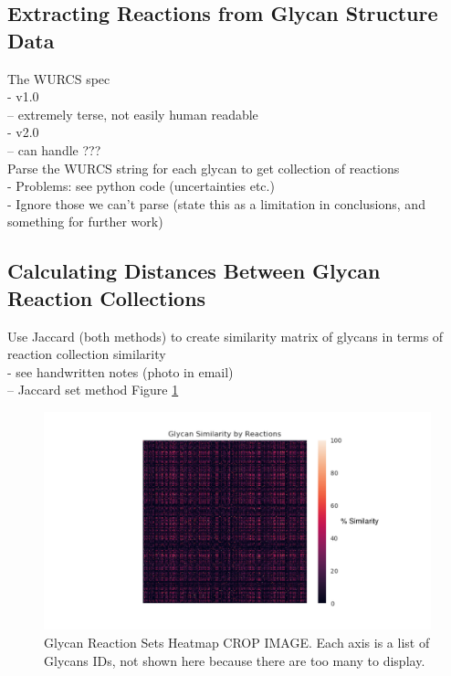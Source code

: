 \documentclass[12pt,a4paper]{article}
\begin{document}
\subsection{Extracting Reactions from Glycan Structure Data}
\label{sec:extracting_reactions}

The WURCS spec\\
- v1.0\\
-- extremely terse, not easily human readable\\
- v2.0\\
-- can handle ???\\

Parse the WURCS string for each glycan to get collection of reactions\\
- Problems: see python code (uncertainties etc.)\\
- Ignore those we can't parse (state this as a limitation in conclusions, and something for further work)\\

\subsection{Calculating Distances Between Glycan Reaction Collections}
\label{sec:distance_calc_set}

Use Jaccard (both methods) to create similarity matrix of glycans in terms of reaction collection similarity\\
- see handwritten notes (photo in email)\\
-- Jaccard set method Figure \ref{fig:heatmap_set_method} \\
\begin{figure}[H]
\centering 
\includegraphics[scale=0.5]{images/heatmap_set_method.pdf} 
\caption{Glycan Reaction Sets Heatmap CROP IMAGE. Each axis is a list of Glycans IDs, not shown here because there are too many to display.}
\label{fig:heatmap_set_method}
\end{figure}
\end{document}
